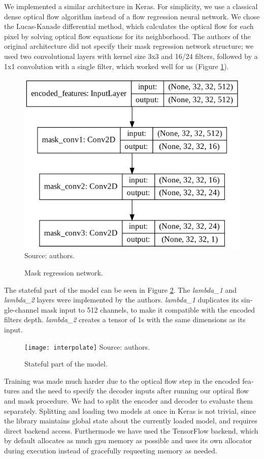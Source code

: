 \documentclass[12pt,openright,oneside,a4paper,english, brazilian]{abntex2}
\begin{document}
\begin{otherlanguage}{english}
We implemented a similar architecture in Keras. For simplicity, we use a classical dense optical flow algorithm instead of a flow regression neural network. We chose the Lucas-Kanade differential method, which calculates the optical flow for each pixel by solving optical flow equations for its neighborhood. The authors of the original architecture did not specify their mask regression network structure; we used two convolutional layers with kernel size 3x3 and 16/24 filters, followed by a 1x1 convolution with a single filter, which worked well for us (Figure \ref{mask_net}).

\begin{figure}[!htb]
\centering
\caption{Mask regression network.}
\includegraphics[width=\textwidth/2]{mask_network}
Source: authors.
\label{mask_net}
\end{figure}

The stateful part of the model can be seen in Figure \ref{stateful_net}. The \textit{lambda\_1} and \textit{lambda\_2} layers were implemented by the authors. \textit{lambda\_1} duplicates its single-channel mask input to 512 channels, to make it compatible with the encoded filters depth. \textit{lambda\_2} creates a tensor of 1s with the same dimensions as its input.

\begin{figure}[!htb]
\centering
\caption{Stateful part of the model.}
\texttt{[image: interpolate]}
Source: authors.
\label{stateful_net}
\end{figure}

Training was made much harder due to the optical flow step in the encoded features and the need to specify the decoder inputs after running our optical flow and mask procedure. We had to split the encoder and decoder to evaluate them separately. Splitting and loading two models at once in Keras is not trivial, since the library maintains global state about the currently loaded model, and requires direct backend access. Furthermode we have used the TensorFlow backend, which by default allocates as much \acrshort{gpu} memory as possible and uses its own allocator during execution instead of gracefully requesting memory as needed.


\end{otherlanguage}
\end{document}
